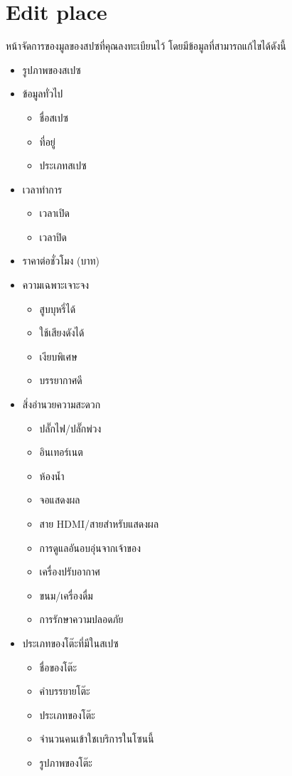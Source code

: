 \section{Edit place}
หน้าจัดการของมูลของสปซที่คุณลงทะเบียนไว้ โดยมีข้อมูลที่สามารถแก้ไขได้ดังนี้
\begin{itemize}
    \item รูปภาพของสเปซ
    \item ข้อมูลทั่วไป
    \begin{itemize}
        \item ชื่อสเปซ
        \item ที่อยู่
        \item ประเภทสเปซ        
    \end{itemize}
    \item เวลาทำการ
    \begin{itemize}
        \item เวลาเปิด
        \item เวลาปิด        
    \end{itemize}
    \item ราคาต่อชั่วโมง (บาท)
    \item ความเฉพาะเจาะจง
    \begin{itemize}
        \item สูบบุหรี่ได้
        \item ใช้เสียงดังได้
        \item เงียบพิเศษ
        \item บรรยากาศดี
    \end{itemize}
    \item สิ่งอำนวยความสะดวก
    \begin{itemize}
        \item ปลั๊กไฟ/ปลั๊กพ่วง
        \item อินเทอร์เนต
        \item ห้องน้ำ
        \item จอแสดงผล
        \item สาย HDMI/สายสำหรับแสดงผล
        \item การดูแลอันอบอุ่นจากเจ้าของ
        \item เครื่องปรับอากาศ
        \item ขนม/เครื่องดื่ม
        \item การรักษาความปลอดภัย
    \end{itemize}
    \item ประเภทของโต๊ะที่มีในสเปซ
    \begin{itemize}
        \item ชื่อของโต๊ะ
        \item คำบรรยายโต๊ะ
        \item ประเภทของโต๊ะ
        \item จำนวนคนเข้าใชเบริการในโซนนี้
        \item รูปภาพของโต๊ะ        
    \end{itemize}
\end{itemize}
